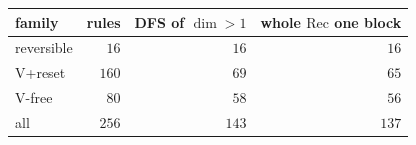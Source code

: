 \begin{tabular}{lrrr}
\hline
family & rules & DFS of $\dim>1$ & whole $\mathrm{Rec}$ one block \\
\hline
reversible & $16$ & $16$ & $16$ \\
V+reset & $160$ & $69$ & $65$ \\
V-free & $80$ & $58$ & $56$ \\
\hline
all & $256$ & $143$ & $137$ \\
\hline
\end{tabular}
